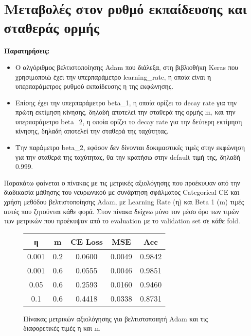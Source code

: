 \documentclass[12pt,a4paper]{article}
\begin{document}
\section{Μεταβολές στον ρυθμό εκπαίδευσης και σταθεράς ορμής}
\label{Μεταβολές στον ρυθμό εκπαίδευσης και σταθεράς ορμής}

\textbf{Παρατηρήσεις:}
\begin{itemize}
    \item Ο αλγόριθμος βελτιστοποίησης Adam που διάλεξα, στη βιβλιοθήκη Keras που χρησιμοποιώ έχει την υπερπαράμετρο learning\_rate, η οποία είναι η υπερπαράμετρος ρυθμού εκπαίδευσης η της εκφώνησης. 
    \item Επίσης έχει την υπερπαράμετρο beta\_1, η οποία ορίζει το decay rate για την πρώτη εκτίμηση κίνησης, δηλαδή αποτελεί την σταθερά της ορμής m, και την υπερπαράμετρο beta\_2, η οποία ορίζει το decay rate για την δεύτερη εκτίμηση κίνησης, δηλαδή αποτελεί την σταθερά της ταχύτητας. 
    \item Την παράμετρο beta\_2, εφόσον δεν δίνονται δοκιμαστικές τιμές στην εκφώνηση για την σταθερά της ταχύτητας, θα την κρατήσω στην default τιμή της, δηλαδή 0.999.
\end{itemize}

Παρακάτω φαίνεται ο πίνακας με τις μετρικές αξιολόγησης που προέκυψαν από την διαδικασία μάθησης του νευρωνικού με συνάρτηση σφάλματος Categorical CE και χρήση μεθόδου βελτιστοποίησης Adam, με Learning Rate (η) και Beta 1 (m) τιμές αυτές που ζητούνται κάθε φορά. Στον πίνακα δείχνω μόνο τον μέσο όρο των τιμών των μετρικών που προέκυψαν από το evaluation με το validation set σε κάθε fold.

\begin{figure}[H]
    \begin{center}
    \begin{tabular}{ |c|c|c|c|c| } 
        \hline
        \textbf{η} & \textbf{m} & \textbf{CE Loss} & \textbf{MSE} & \textbf{Acc} \\ \hline
        0.001 & 0.2 & 0.0600 & 0.0049 & 0.9842 \\
        \hline
        0.001 & 0.6 & 0.0555 & 0.0046 & 0.9851 \\
        \hline
        0.05  & 0.6 & 0.2593 & 0.0160 & 0.9460 \\ 
        \hline
        0.1   & 0.6 & 0.4418 & 0.0338 & 0.8731 \\ 
        \hline
    \end{tabular}
    \end{center}
    \caption{Πίνακας μετρικών αξιολόγησης για βελτιστοποιητή Adam και τις διαφορετικές τιμές η και m}
\end{figure}
\end{document}
